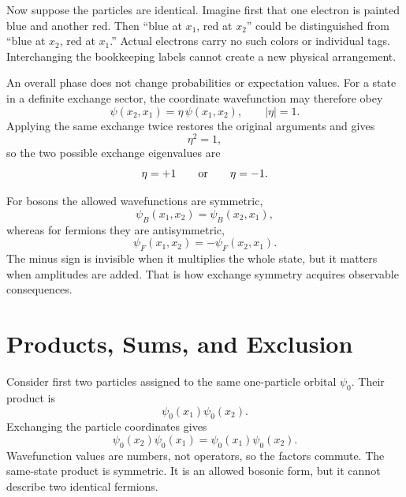 Now suppose the particles are identical. Imagine first that one electron is painted blue and another red. Then ``blue at \(x_1\), red at \(x_2\)'' could be distinguished from ``blue at \(x_2\), red at \(x_1\).'' Actual electrons carry no such colors or individual tags. Interchanging the bookkeeping labels cannot create a new physical arrangement.

An overall phase does not change probabilities or expectation values. For a state in a definite exchange sector, the coordinate wavefunction may therefore obey
\begin{equation}
\psi(x_2,x_1)=\eta\,\psi(x_1,x_2),
\qquad
\lvert\eta\rvert=1.
\end{equation}
Applying the same exchange twice restores the original arguments and gives
\begin{equation}
\eta^2=1,
\end{equation}
so the two possible exchange eigenvalues are
\begin{equation}
\eta=+1
\qquad\hbox{or}\qquad
\eta=-1.
\end{equation}


For bosons the allowed wavefunctions are symmetric,
\begin{equation}
\psi_B(x_1,x_2)=\psi_B(x_2,x_1),
\end{equation}
whereas for fermions they are antisymmetric,
\begin{equation}
\psi_F(x_1,x_2)=-\psi_F(x_2,x_1).
\end{equation}
The minus sign is invisible when it multiplies the whole state, but it matters when amplitudes are added. That is how exchange symmetry acquires observable consequences.

\section{Products, Sums, and Exclusion}

Consider first two particles assigned to the same one-particle orbital \(\psi_0\). Their product is
\begin{equation}
\psi_0(x_1)\psi_0(x_2).
\end{equation}
Exchanging the particle coordinates gives
\begin{equation}
\psi_0(x_2)\psi_0(x_1)
=
\psi_0(x_1)\psi_0(x_2).
\end{equation}
Wavefunction values are numbers, not operators, so the factors commute. The same-state product is symmetric. It is an allowed bosonic form, but it cannot describe two identical fermions.

